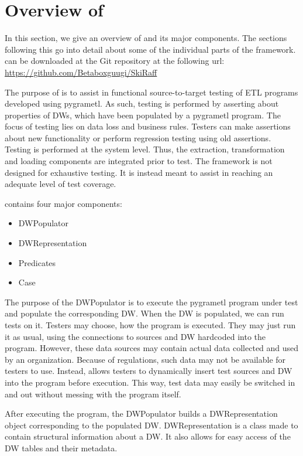 \section{Overview of \FW{}}\label{sect:Overview}
In this section, we give an overview of \FW{} and its major components. The sections following this go into detail about some of the individual parts of the framework. \FW{} can be downloaded at the  Git repository at the following url: \url{https://github.com/Betaboxguugi/SkiRaff}

The purpose of \FW{} is to assist in functional source-to-target testing of ETL programs developed using pygrametl. As such, testing is performed by asserting about properties of DWs, which have been populated by a pygrametl program. The focus of testing lies on data loss and business rules. Testers can make assertions about new functionality or perform regression testing using old assertions. Testing is performed at the system level. Thus, the extraction, transformation and loading components are integrated prior to test. The framework is not designed for exhaustive testing. It is instead meant to assist in reaching an adequate level of test coverage.

\FW{} contains four major components:
\begin{itemize}
\item DWPopulator
\item DWRepresentation
\item Predicates
\item Case 
\end{itemize}

The purpose of the DWPopulator is to execute the pygrametl program under test and populate the corresponding DW. When the DW is populated, we can run tests on it.  Testers may choose, how the program is executed. They may just run it as usual, using the connections to sources and DW hardcoded into the program. However, these data sources may contain actual data collected and used by an organization. Because of regulations, such data may not be available for testers to use. Instead, \FW{} allows testers to dynamically insert test sources and DW into the program before execution. This way, test data may easily be switched in and out without messing with the program itself.  

After executing the program, the DWPopulator builds a DWRepresentation object corresponding to the populated DW. DWRepresentation is a class made to contain structural information about a DW. It also allows for easy access of the DW tables and their metadata.

